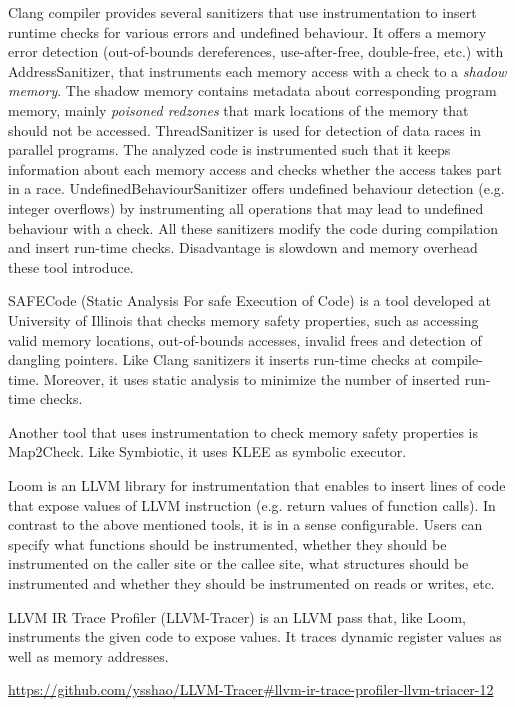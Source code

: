 Clang compiler provides several sanitizers that use instrumentation to insert
runtime checks for various errors and undefined behaviour. It offers a memory
error detection (out-of-bounds dereferences, use-after-free, double-free, etc.)
with AddressSanitizer, that instruments each memory access with a check to a
\textit{shadow memory}. The shadow memory contains metadata about corresponding
program memory, mainly \textit{poisoned redzones} that mark locations of the
memory that should not be accessed. ThreadSanitizer is used for detection of
data races in parallel programs. The analyzed code is instrumented such that it
keeps information about each memory access and checks whether the access takes
part in a race. UndefinedBehaviourSanitizer offers undefined behaviour
detection (e.g. integer overflows) by instrumenting all operations that may
lead to undefined behaviour with a check. All these sanitizers modify the code
during compilation and insert run-time checks. Disadvantage is slowdown and
memory overhead these tool introduce.

SAFECode (Static Analysis For safe Execution of Code) is a tool developed at
University of Illinois that checks memory safety properties, such as accessing
valid memory locations, out-of-bounds accesses, invalid frees and detection of
dangling pointers. Like Clang sanitizers it inserts run-time checks at
compile-time. Moreover, it uses static analysis to minimize the number of
inserted run-time checks.

Another tool that uses instrumentation to check memory safety properties is
Map2Check. Like Symbiotic, it uses KLEE as symbolic executor. 

Loom is an LLVM library for instrumentation that enables to insert lines of
code that expose values of LLVM instruction (e.g. return values of function
calls). In contrast to the above mentioned tools, it is in a sense
configurable. Users can specify what functions should be instrumented, whether
they should be instrumented on the caller site or the callee site, what
structures should be instrumented and whether they should be instrumented on
reads or writes, etc.

LLVM IR Trace Profiler (LLVM-Tracer) is an LLVM pass that, like Loom,
instruments the given code to expose values. It traces dynamic register values
as well as memory addresses.

\url{https://github.com/ysshao/LLVM-Tracer#llvm-ir-trace-profiler-llvm-triacer-12}
